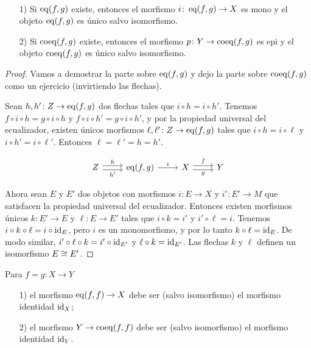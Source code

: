 \documentclass{article}
\numberwithin{equation}{section}
\theoremstyle{definition}
\begin{document}
\begin{observacion}
  ~

  \begin{enumerate}
  \item[1)] Si $\operatorname{eq} (f,g)$ existe, entonces el morfismo
    $i\colon \operatorname{eq} (f,g) \to X$ es mono y el objeto $\operatorname{eq} (f,g)$ es único salvo
    isomorfismo.

  \item[2)] Si $\operatorname{coeq} (f,g)$ existe, entonces el morfismo
    $p\colon Y\to \operatorname{coeq} (f,g)$ es epi y el objeto $\operatorname{coeq} (f,g)$ es único salvo
    isomorfismo.
  \end{enumerate}

  \begin{proof}
    Vamos a demostrar la parte sobre $\operatorname{eq} (f,g)$ y dejo la parte sobre
    $\operatorname{coeq} (f,g)$ como un ejercicio (invirtiendo las flechas).

    Sean $h,h'\colon Z \to \operatorname{eq} (f,g)$ dos flechas tales que
    $i\circ h = i\circ h'$. Tenemos $f\circ i\circ h = g\circ i\circ h$ y
    $f\circ i\circ h' = g\circ i\circ h'$, y por la propiedad universal del
    ecualizador, existen únicos morfismos $\ell, \ell'\colon Z \to \operatorname{eq} (f,g)$
    tales que $i\circ h = i\circ \ell$ y $i\circ h' = i\circ \ell'$. Entonces
    $\ell = \ell' = h = h'$.

    \[ \begin{tikzcd}
        Z\ar[shift left=0.25em]{r}{h}\ar[shift right=0.25em]{r}[swap]{h'} & \eq (f,g)\ar{r}{i} & X\ar[shift left=0.25em]{r}{f}\ar[shift right=0.25em]{r}[swap]{g} & Y
      \end{tikzcd} \]

    Ahora sean $E$ y $E'$ dos objetos con morfismos $i\colon E \to X$ y
    $i'\colon E' \to M$ que satisfacen la propiedad universal del
    ecualizador. Entonces existen morfismos únicos $k\colon E'\to E$ y
    $\ell\colon E \to E'$ tales que $i\circ k = i'$ y $i'\circ \ell =
    i$. Tenemos $i\circ k\circ \ell = i\circ \mathrm{id}_{E}$, pero $i$ es un
    monomorfismo, y por lo tanto $k\circ \ell = \mathrm{id}_{E}$. De modo similar,
    $i'\circ \ell\circ k = i'\circ \mathrm{id}_{E'}$ y $\ell\circ k = \mathrm{id}_{E'}$. Las
    flechas $k$ y $\ell$ definen un isomorfismo $E\cong E'$.
  \end{proof}
\end{observacion}

\begin{ejemplo}
  Para $f = g\colon X\to Y$

  \begin{enumerate}
  \item[1)] el morfismo $\operatorname{eq} (f,f)\to X$ debe ser (salvo isomorfismo) el
    morfismo identidad $\mathrm{id}_{X}$;

  \item[2)] el morfismo $Y\to \operatorname{coeq} (f,f)$ debe ser (salvo isomorfismo) el
    morfismo identidad $\mathrm{id}_{Y}$. \qedhere
  \end{enumerate}
\end{ejemplo}
\end{document}
